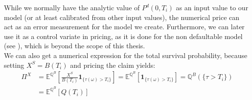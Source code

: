\documentclass[12pt]{article}
\begin{document}
	While we normally have the analytic value of $P^d(0, T_i)$ as an input value to our model (or at least calibrated from other input values), the numerical price can act as an error measurement for the model we create. Furthermore, we can later use it as a control variate in pricing, as it is done for the non defaultable model (see \cite{FriesBook}), which is beyond the scope of this thesis.\\
	We can also get a numerical expression for the total survival probability, because setting
	$X^S = B(T_i)$ and pricing the claim yields:
	\begin{align*}
		\Pi^X &= \mathbb{E}^{\mathbb{Q}^B}\left[ \frac{X^S}{B(T_i)} \mathbf{1}_{\{\tau(\omega) > T_i\}}\right] = \mathbb{E}^{\mathbb{Q}^B}\left[ \mathbf{1}_{\{\tau(\omega) > T_i\}}\right]
		= \mathbb{Q}^B(\{\tau > T_i\})\\
		&= \mathbb{E}^{\mathbb{Q}^B}\left[ Q(T_i)\right]
	\end{align*}
\end{document}

